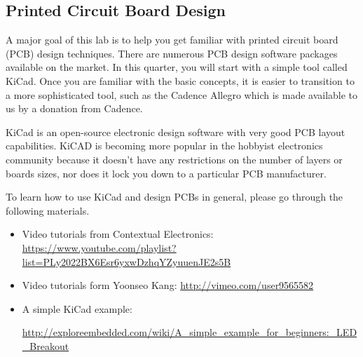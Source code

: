 \documentclass[letterpaper, 11pt]{article}
\begin{document}
\subsection{Printed Circuit Board Design}
A major goal of this lab is to help you get familiar with printed circuit board (PCB) design techniques. There are numerous PCB design software packages available on the market. In this quarter, you will start with a simple tool called KiCad. Once you are familiar with the basic concepts, it is easier to transition to a more sophisticated tool, such as the Cadence Allegro which is made available to us by a donation from Cadence. 

KiCad is an open-source electronic design software with very good PCB layout capabilities. KiCAD is becoming more popular in the hobbyist electronics community because it doesn't have any restrictions on the number of layers or boards sizes, nor does it lock you down to a particular PCB manufacturer.

To learn how to use KiCad and design PCBs in general, please go through the following materials.

\begin{itemize}[itemsep=0.1ex]

	\item Video tutorials from Contextual Electronics:	 \url{https://www.youtube.com/playlist?list=PLy2022BX6Esr6yxwDzhqYZyuuenJE2s5B} 
	
	\item 	Video tutorials form  Yoonseo Kang:	 \url{http://vimeo.com/user9565582} 

	\item A simple KiCad example: 
	
	\url{http://exploreembedded.com/wiki/A_simple_example_for_beginners:_LED_Breakout} 
		
\end{itemize}
\end{document}
